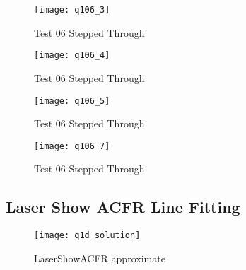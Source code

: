 			\begin{figure}[position = here]
				\begin{centering}
					\texttt{[image: q106\_3]}\\
					\caption[\textit{RPYAxes}]{Test 06 Stepped Through}
				\end{centering}
			\end{figure}
			\newline			
			
			\begin{figure}[position = here]
				\begin{centering}
					\texttt{[image: q106\_4]}\\
					\caption[\textit{RPYAxes}]{Test 06 Stepped Through}
				\end{centering}
			\end{figure}
			\newline			
			
			\begin{figure}[position = here]
				\begin{centering}
					\texttt{[image: q106\_5]}\\
					\caption[\textit{RPYAxes}]{Test 06 Stepped Through}
				\end{centering}
			\end{figure}
			\newline			
			
			\begin{figure}[position = here]
				\begin{centering}
					\texttt{[image: q106\_6]}\\
					\caption[\textit{RPYAxes}]Test 06 Stepped Through}
				\end{centering}
			\end{figure}
			\newline								
			
			\begin{figure}[position = here]
				\begin{centering}
					\texttt{[image: q106\_7]}\\
					\caption[\textit{RPYAxes}]{Test 06 Stepped Through}
				\end{centering}
			\end{figure}
			\newline										

	\pagebreak
	\subsection{Laser Show ACFR Line Fitting}	%
			
			\linebreak
			\begin{figure}[position = here]
				\begin{centering}
					\texttt{[image: q1d\_solution]}\\
					\caption[\textit{RPYAxes}]{LaserShowACFR approximate}
				\end{centering}
			\end{figure}
			\newline	
			
